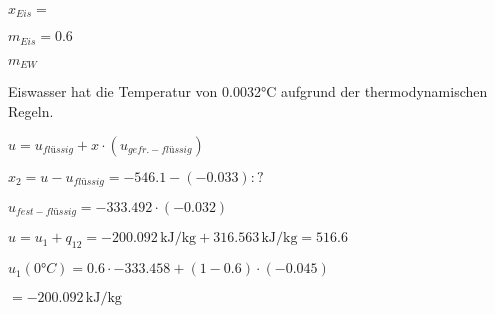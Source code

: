 \( x_{Eis} = \)  

\( m_{Eis} = 0.6 \)  

\( m_{EW} \)  

Eiswasser hat die Temperatur von 0.0032°C  
aufgrund der thermodynamischen Regeln.  

\( u = u_{flüssig} + x \cdot (u_{gefr.-flüssig}) \)  

\( x_2 = u - u_{flüssig} = -546.1 - (-0.033) : ? \)  

\( u_{fest-flüssig} = -333.492 \cdot (-0.032) \)  

\( u = u_1 + q_{12} = -200.092 \, \text{kJ/kg} + 316.563 \, \text{kJ/kg} = 516.6 \)  

\( u_1 (0°C) = 0.6 \cdot -333.458 + (1 - 0.6) \cdot (-0.045) \)  

\( = -200.092 \, \text{kJ/kg} \)